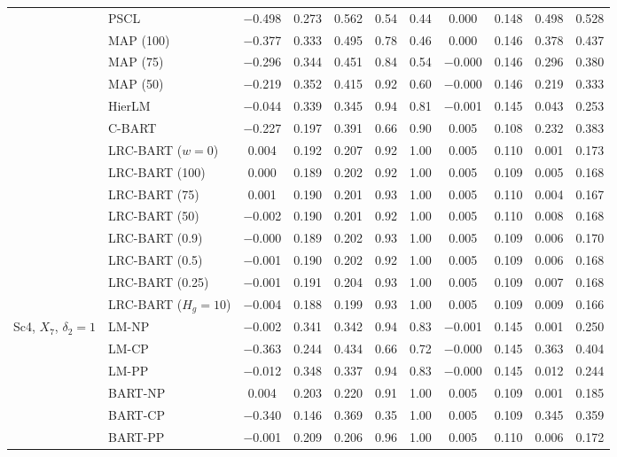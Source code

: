 \documentclass[11pt]{article}
\theoremstyle{definition}
\theoremstyle{plain}
\begin{document}
\begin{center}
\begin{longtable}{llccccccccc}
& PSCL & $-$0.498 & 0.273 & 0.562 & 0.54 & 0.44 & 0.000 & 0.148 & 0.498 & 0.528 \\
& MAP (100) & $-$0.377 & 0.333 & 0.495 & 0.78 & 0.46 & 0.000 & 0.146 & 0.378 & 0.437 \\
& MAP (75) & $-$0.296 & 0.344 & 0.451 & 0.84 & 0.54 & $-$0.000 & 0.146 & 0.296 & 0.380 \\
& MAP (50) & $-$0.219 & 0.352 & 0.415 & 0.92 & 0.60 & $-$0.000 & 0.146 & 0.219 & 0.333 \\
& HierLM & $-$0.044 & 0.339 & 0.345 & 0.94 & 0.81 & $-$0.001 & 0.145 & 0.043 & 0.253 \\
& C-BART & $-$0.227 & 0.197 & 0.391 & 0.66 & 0.90 & 0.005 & 0.108 & 0.232 & 0.383 \\
& LRC-BART ($w=0$) & 0.004 & 0.192 & 0.207 & 0.92 & 1.00 & 0.005 & 0.110 & 0.001 & 0.173 \\
& LRC-BART (100) & 0.000 & 0.189 & 0.202 & 0.92 & 1.00 & 0.005 & 0.109 & 0.005 & 0.168 \\
& LRC-BART (75) & 0.001 & 0.190 & 0.201 & 0.93 & 1.00 & 0.005 & 0.110 & 0.004 & 0.167 \\
& LRC-BART (50) & $-$0.002 & 0.190 & 0.201 & 0.92 & 1.00 & 0.005 & 0.110 & 0.008 & 0.168 \\
& LRC-BART (0.9) & $-$0.000 & 0.189 & 0.202 & 0.93 & 1.00 & 0.005 & 0.109 & 0.006 & 0.170 \\
& LRC-BART (0.5) & $-$0.001 & 0.190 & 0.202 & 0.92 & 1.00 & 0.005 & 0.109 & 0.006 & 0.168 \\
& LRC-BART (0.25) & $-$0.001 & 0.191 & 0.204 & 0.93 & 1.00 & 0.005 & 0.109 & 0.007 & 0.168 \\
& LRC-BART ($H_g=10$) & $-$0.004 & 0.188 & 0.199 & 0.93 & 1.00 & 0.005 & 0.109 & 0.009 & 0.166 \\
\midrule
\multirow{20}{*}{Sc4, $X_7$, $\delta_2=1$} & LM-NP & $-$0.002 & 0.341 & 0.342 & 0.94 & 0.83 & $-$0.001 & 0.145 & 0.001 & 0.250 \\
& LM-CP & $-$0.363 & 0.244 & 0.434 & 0.66 & 0.72 & $-$0.000 & 0.145 & 0.363 & 0.404 \\
& LM-PP & $-$0.012 & 0.348 & 0.337 & 0.94 & 0.83 & $-$0.000 & 0.145 & 0.012 & 0.244 \\
& BART-NP & 0.004 & 0.203 & 0.220 & 0.91 & 1.00 & 0.005 & 0.109 & 0.001 & 0.185 \\
& BART-CP & $-$0.340 & 0.146 & 0.369 & 0.35 & 1.00 & 0.005 & 0.109 & 0.345 & 0.359 \\
& BART-PP & $-$0.001 & 0.209 & 0.206 & 0.96 & 1.00 & 0.005 & 0.110 & 0.006 & 0.172 \\

\end{longtable}
\end{center}
\end{document}
